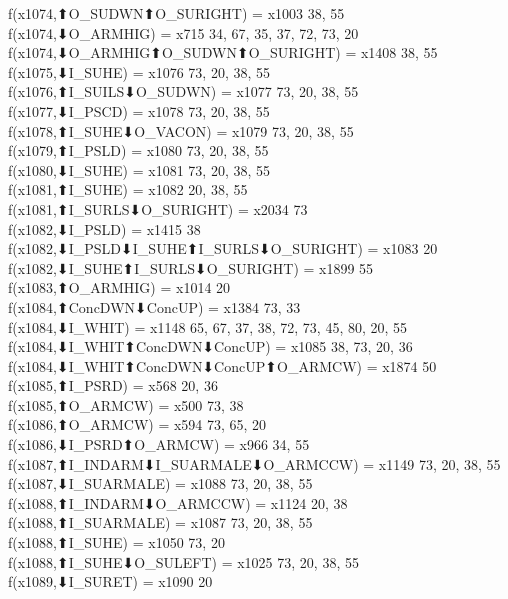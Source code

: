 f(x1074,⬆O_SUDWN⬆O_SURIGHT) = x1003 {38, 55} \\
f(x1074,⬇O_ARMHIG) = x715 {34, 67, 35, 37, 72, 73, 20} \\
f(x1074,⬇O_ARMHIG⬆O_SUDWN⬆O_SURIGHT) = x1408 {38, 55} \\
f(x1075,⬇I_SUHE) = x1076 {73, 20, 38, 55} \\
f(x1076,⬆I_SUILS⬇O_SUDWN) = x1077 {73, 20, 38, 55} \\
f(x1077,⬇I_PSCD) = x1078 {73, 20, 38, 55} \\
f(x1078,⬆I_SUHE⬇O_VACON) = x1079 {73, 20, 38, 55} \\
f(x1079,⬆I_PSLD) = x1080 {73, 20, 38, 55} \\
f(x1080,⬇I_SUHE) = x1081 {73, 20, 38, 55} \\
f(x1081,⬆I_SUHE) = x1082 {20, 38, 55} \\
f(x1081,⬆I_SURLS⬇O_SURIGHT) = x2034 {73} \\
f(x1082,⬇I_PSLD) = x1415 {38} \\
f(x1082,⬇I_PSLD⬇I_SUHE⬆I_SURLS⬇O_SURIGHT) = x1083 {20} \\
f(x1082,⬇I_SUHE⬆I_SURLS⬇O_SURIGHT) = x1899 {55} \\
f(x1083,⬆O_ARMHIG) = x1014 {20} \\
f(x1084,⬆ConcDWN⬇ConcUP) = x1384 {73, 33} \\
f(x1084,⬇I_WHIT) = x1148 {65, 67, 37, 38, 72, 73, 45, 80, 20, 55} \\
f(x1084,⬇I_WHIT⬆ConcDWN⬇ConcUP) = x1085 {38, 73, 20, 36} \\
f(x1084,⬇I_WHIT⬆ConcDWN⬇ConcUP⬆O_ARMCW) = x1874 {50} \\
f(x1085,⬆I_PSRD) = x568 {20, 36} \\
f(x1085,⬆O_ARMCW) = x500 {73, 38} \\
f(x1086,⬆O_ARMCW) = x594 {73, 65, 20} \\
f(x1086,⬇I_PSRD⬆O_ARMCW) = x966 {34, 55} \\
f(x1087,⬆I_INDARM⬇I_SUARMALE⬇O_ARMCCW) = x1149 {73, 20, 38, 55} \\
f(x1087,⬇I_SUARMALE) = x1088 {73, 20, 38, 55} \\
f(x1088,⬆I_INDARM⬇O_ARMCCW) = x1124 {20, 38} \\
f(x1088,⬆I_SUARMALE) = x1087 {73, 20, 38, 55} \\
f(x1088,⬆I_SUHE) = x1050 {73, 20} \\
f(x1088,⬆I_SUHE⬇O_SULEFT) = x1025 {73, 20, 38, 55} \\
f(x1089,⬇I_SURET) = x1090 {20} \\
